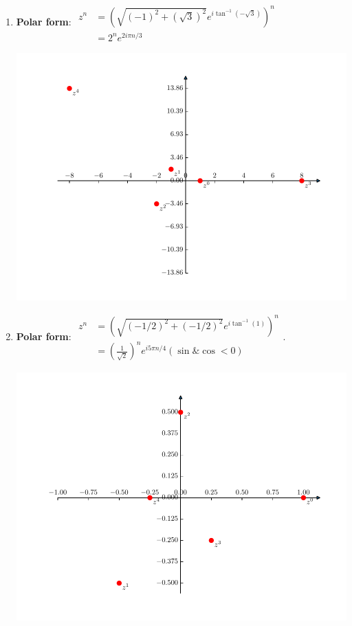 \documentclass[
    hw=1,
    classnum=MATH564,
    classname=MATHEMATICAL\ MODELING,
    due=January\ 28\,\ 2020,
    author=Gabrielle\ Streeter\qquad Hannah\ Wu\qquad\ Minghang\ Li,
    authorshort=Streeter\ \&\ Wu\ \&\ Li,
    teacher= Zachary\ M.\ Boyd,
]{../hw-template}
\begin{document}
\begin{homeworkProblem}
\begin{multicols}{2}
\begin{enumerate}
\item \textbf{Polar form}:
$\begin{aligned}
    z^n &= (\sqrt{(-1)^2 + (\sqrt{3})^2} e^{i\tan^{-1}(-\sqrt{3})})^n\\
    &= 2^n e^{2i\pi n/3}
\end{aligned}$
\begin{Figure}
    \centering
    \includegraphics[scale=0.5]{fig/fig8(d).pdf}
\end{Figure}
\item \textbf{Polar form}:
$\begin{aligned}
    z^n &= (\sqrt{(-1/2)^2+(-1/2)^2} e^{i\tan^{-1}(1)})^n\\
    &=(\frac{1}{\sqrt{2}})^n e^{i5\pi n/4} (\sin \& \cos < 0)
\end{aligned}$.
\begin{Figure}
    \centering
    \includegraphics[scale=0.5]{fig/fig8(e).pdf}
\end{Figure}

\end{enumerate}
\end{multicols}
\end{homeworkProblem}
\end{document}
